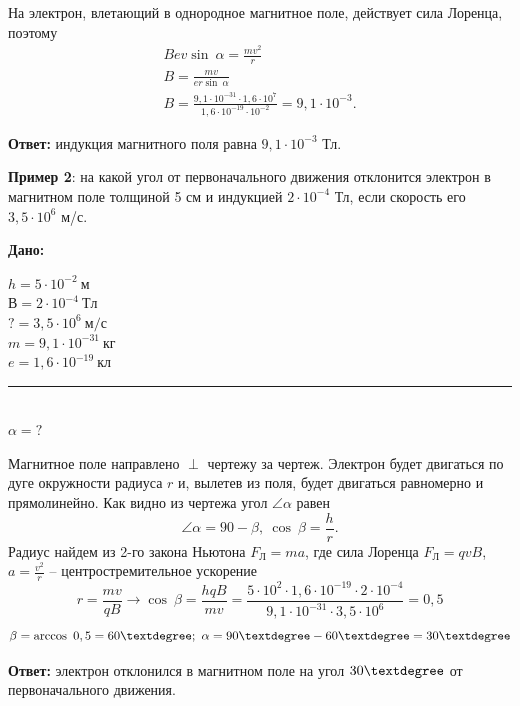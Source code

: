 \documentclass[a5paper, 10pt]{diss_4}
\renewcommand{\'}{\,'}
\begin{document}
На электрон, влетающий в однородное магнитное поле, действует сила Лоренца, поэтому
\begin{gather*}
  Bev\sin\ \alpha=\frac{mv^2}{r}\\
  B=\frac{mv}{er\sin\ \alpha}\\
  B=\frac{9,1\cdot10^{-31}\cdot1,6\cdot10^7}{1,6\cdot10^{-19}\cdot10^{-2}}=9,1\cdot10^{-3}.
\end{gather*}

\textbf{Ответ:}  индукция магнитного поля равна $9,1\cdot10^{-3}$ Тл.


\textbf{Пример 2}: на какой угол от первоначального движения отклонится электрон в магнитном поле толщиной 5 см и индукцией
$2\cdot10^{-4}$ Тл, если скорость его $3,5\cdot10^6$ м/с.

\hspace{1cm}\textbf{Дано:}\hspace{.3cm}
\parbox[t]{4cm}{
$h= 5\cdot10^{-2}\ м$\\
$В= 2\cdot10^{-4}\ Тл$\\
$?= 3,5\cdot10^{6}\ м/с$\\
$m= 9,1\cdot10^{-31}\ кг$\\
$e= 1,6\cdot10^{-19}\ кл$\\
\rule{4cm}{.4pt}\\
$\alpha = ?$\\
}

Магнитное поле направлено $\perp$ чертежу за чертеж. Электрон  будет двигаться по дуге окружности радиуса $r$
и, вылетев из поля, будет двигаться равномерно  и прямолинейно. Как видно из чертежа угол $\angle \alpha$ равен
\[
\angle \alpha=90-\beta,\ \cos\ \beta=\frac{h}{r}.
\]
Радиус найдем из 2-го закона  Ньютона $F_Л=ma$, где сила Лоренца $F_Л= qvB$, $a=\frac{v^2}{r}$ -- центростремительное ускорение
\[
r=\frac{mv}{qB}\to\cos\ \beta=\frac{hqB}{mv}=
\frac{5\cdot10^2\cdot1,6\cdot10^{-19}\cdot2\cdot10^{-4}}{9,1\cdot10^{-31}\cdot3,5\cdot10^6}=0,5
\]
\[
\beta=\arccos\ 0,5=60\textdegree;\ \alpha=90\textdegree-60\textdegree=30\textdegree
\]

\textbf{Ответ:} электрон отклонился в магнитном поле на угол $30\textdegree$ от первоначального движения.
\end{document}
